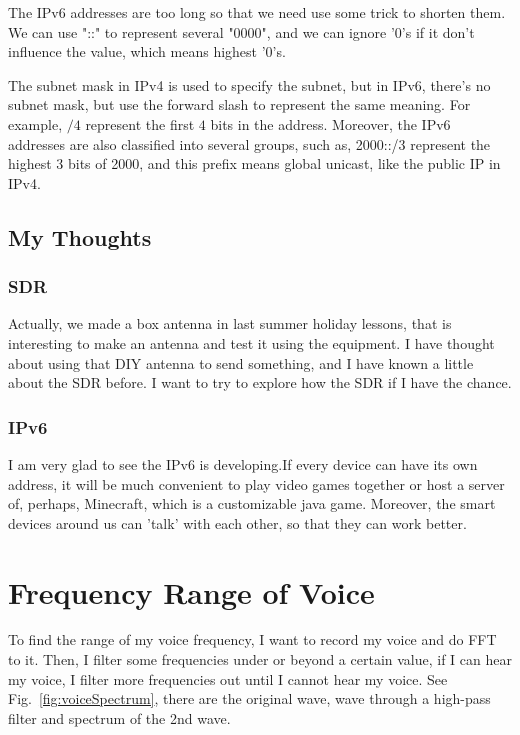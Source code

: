 \documentclass{article}
\begin{document}
The IPv6 addresses are too long so that we need use some trick to shorten them. We can use "::" to represent several "0000", and we can ignore '0's if it don't influence the value, which means highest '0's.

The subnet mask in IPv4 is used to specify the subnet, but in IPv6, there's no subnet mask, but use the forward slash to represent the same meaning. For example, $/4$ represent the first $4$ bits in the address. Moreover, the IPv6 addresses are also classified into several groups, such as, 2000::/3 represent the highest 3 bits of 2000, and this prefix means global unicast, like the public IP in IPv4.

\subsection{My Thoughts}
\subsubsection*{SDR}
Actually, we made a box antenna in last summer holiday lessons, that is interesting to make an antenna and test it using the equipment. I have thought about using that DIY antenna to send something, and I have known a little about the SDR before. I want to try to explore how the SDR if I have the chance.
\subsubsection*{IPv6}
I am very glad to see the IPv6 is developing.If every device can have its own address, it will be much convenient to play video games together or host a server of, perhaps, Minecraft, which is a customizable java game. Moreover, the smart devices around us can 'talk' with each other, so that they can work better.

\section{Frequency Range of Voice}
To find the range of my voice frequency, I want to record my voice and do FFT to it. Then, I filter some frequencies under or beyond a certain value, if I can hear my voice, I filter more frequencies out until I cannot hear my voice. See Fig.~\ref{fig:voiceSpectrum}, there are the original wave, wave through a high-pass filter and spectrum of the 2nd wave.
\end{document}
